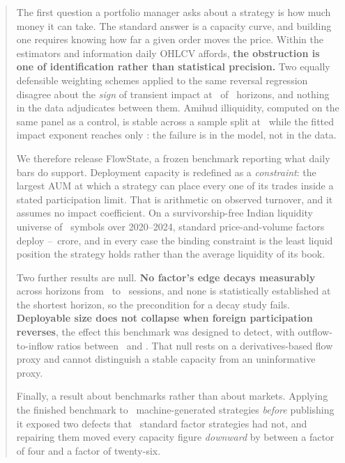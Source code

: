 \documentclass[11pt,a4paper]{article}
\begin{document}

\begin{abstract}
\noindent
The first question a portfolio manager asks about a strategy is how much money it can take. The
standard answer is a capacity curve, and building one requires knowing how far a given order moves
the price. Within the estimators and information daily OHLCV affords, \textbf{the obstruction is
one of identification rather than statistical precision.} Two equally
defensible weighting schemes applied to the same reversal regression disagree about the
\emph{sign} of transient impact at \fsSignDisagreements\ of \fsHorizonsTested\ horizons, and nothing
in the data adjudicates between them. Amihud illiquidity, computed on the same panel as a control,
is stable across a sample split at \fsAmihudSpearman\ while the fitted impact exponent reaches only
\fsDeltaSpearman: the failure is in the model, not in the data.

We therefore release FlowState, a frozen benchmark reporting what daily bars do support.
Deployment capacity is redefined as a \emph{constraint}: the largest AUM at which a strategy can
place every one of its trades inside a stated participation limit. That is arithmetic on observed
turnover, and it assumes no impact coefficient. On a survivorship-free Indian liquidity universe of
\fsNSymbols\ symbols over 2020--2024, standard price-and-volume factors deploy
\rupee\fsFactorBindingMin--\fsFactorBindingMax\ crore, and in every case the binding constraint is
the least liquid position the strategy holds rather than the average liquidity of its book.

Two further results are null. \textbf{No factor's edge decays measurably} across horizons from
\fsHorizonMin\ to \fsHorizonMax\ sessions, and none is statistically established at the shortest
horizon, so the precondition for a decay study fails. \textbf{Deployable size does not collapse when
foreign participation reverses}, the effect this benchmark was designed to detect, with
outflow-to-inflow ratios between \fsFlowRatioMin\ and \fsFlowRatioMax. That null rests on a
derivatives-based flow proxy and cannot distinguish a stable capacity from an uninformative proxy.

Finally, a result about benchmarks rather than about markets. Applying the finished benchmark to
\fsCorpusN\ machine-generated strategies \emph{before} publishing it exposed two defects that
\fsNFactors\ standard factor strategies had not, and repairing them moved every capacity figure
\emph{downward} by between a factor of four and a factor of twenty-six.
\end{abstract}
\end{document}
